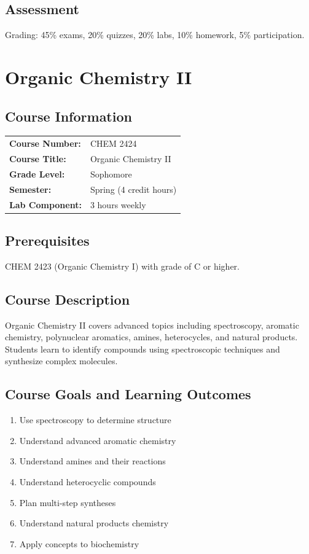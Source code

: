 \documentclass[12pt,oneside]{book}
\begin{document}
\section{Assessment}

Grading: 45\% exams, 20\% quizzes, 20\% labs, 10\% homework, 5\% participation.


\chapter{Organic Chemistry II}

\section{Course Information}

\begin{tabular}{ll}
\textbf{Course Number:} & CHEM 2424 \\
\textbf{Course Title:} & Organic Chemistry II \\
\textbf{Grade Level:} & Sophomore \\
\textbf{Semester:} & Spring (4 credit hours) \\
\textbf{Lab Component:} & 3 hours weekly \\
\end{tabular}

\section{Prerequisites}

CHEM 2423 (Organic Chemistry I) with grade of C or higher.

\section{Course Description}

Organic Chemistry II covers advanced topics including spectroscopy, aromatic chemistry, polynuclear aromatics, amines, heterocycles, and natural products. Students learn to identify compounds using spectroscopic techniques and synthesize complex molecules.

\section{Course Goals and Learning Outcomes}

\begin{enumerate}
    \item Use spectroscopy to determine structure
    \item Understand advanced aromatic chemistry
    \item Understand amines and their reactions
    \item Understand heterocyclic compounds
    \item Plan multi-step syntheses
    \item Understand natural products chemistry
    \item Apply concepts to biochemistry
\end{enumerate}
\end{document}
